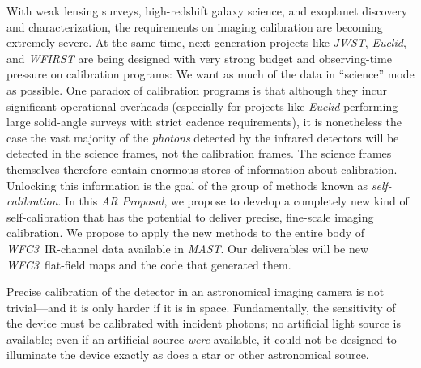 \documentclass[12pt]{article}
\newcommand{\documentname}{\textsl{AR Proposal}}
\newcommand{\project}[1]{\textsl{#1}}
\newcommand{\WFC}{\project{WFC3}}
\newcommand{\MAST}{\project{MAST}}
\begin{document}
%
%
\justification          %

With weak lensing surveys, high-redshift galaxy science, and exoplanet
discovery and characterization, the requirements on imaging
calibration are becoming extremely severe.  At the same time,
next-generation projects like \project{JWST}, \project{Euclid}, and
\project{WFIRST} are being designed with very strong budget and
observing-time pressure on calibration programs: We want as much of
the data in ``science'' mode as possible.  One paradox of calibration
programs is that although they incur significant operational overheads
(especially for projects like \project{Euclid} performing large
solid-angle surveys with strict cadence requirements), it is
nonetheless the case the vast majority of the \emph{photons} detected
by the infrared detectors will be detected in the science frames, not
the calibration frames.  The science frames themselves therefore
contain enormous stores of information about calibration.  Unlocking
this information is the goal of the group of methods known as
\emph{self-calibration}.  In this \documentname, we propose to develop
a completely new kind of self-calibration that has the potential to
deliver precise, fine-scale imaging calibration.  We propose to apply
the new methods to the entire body of \WFC\ IR-channel data available
in \MAST.  Our deliverables will be new \WFC\ flat-field maps and the
code that generated them.

Precise calibration of the detector in an astronomical imaging camera
is not trivial---and it is only harder if it is in space.
Fundamentally, the sensitivity of the device must be calibrated with
incident photons; no artificial light source is available; even if an
artificial source \emph{were} available, it could not be designed to
illuminate the device exactly as does a star or other astronomical
source.
\end{document}
